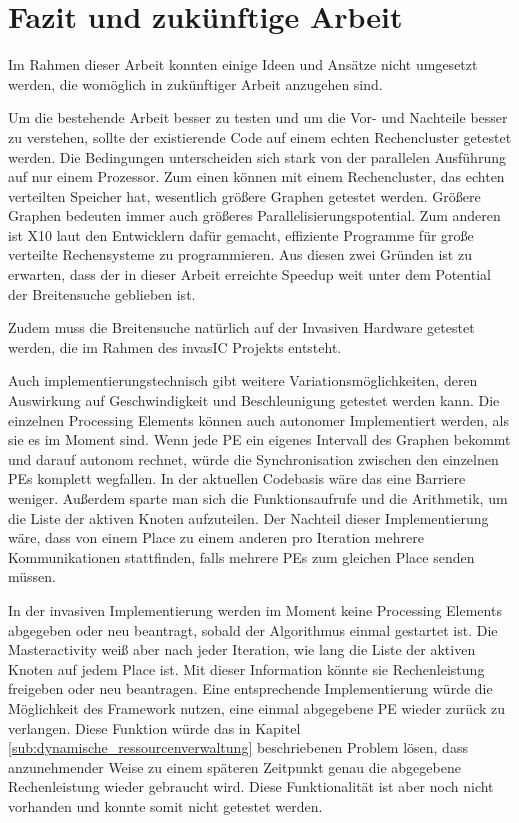 \chapter{Fazit und zukünftige Arbeit} %
\label{cha:fazit_und_zuk_nftige_arbeit}

Im Rahmen dieser Arbeit konnten einige Ideen und Ansätze nicht umgesetzt werden, die womöglich in zukünftiger Arbeit anzugehen sind.

Um die bestehende Arbeit besser zu testen und um die Vor- und Nachteile besser zu verstehen, sollte der existierende Code auf einem echten Rechencluster getestet werden. Die Bedingungen unterscheiden sich stark von der parallelen Ausführung auf nur einem Prozessor. Zum einen können mit einem Rechencluster, das echten verteilten Speicher hat, wesentlich größere Graphen getestet werden. Größere Graphen bedeuten immer auch größeres Parallelisierungspotential. Zum anderen ist X10 laut den Entwicklern dafür gemacht, effiziente Programme für große verteilte Rechensysteme zu programmieren. Aus diesen zwei Gründen ist zu erwarten, dass der in dieser Arbeit erreichte Speedup weit unter dem Potential der Breitensuche geblieben ist. 

Zudem muss die Breitensuche natürlich auf der Invasiven Hardware getestet werden, die im Rahmen des invasIC Projekts entsteht.

Auch implementierungstechnisch gibt weitere Variationsmöglichkeiten, deren Auswirkung auf Geschwindigkeit und Beschleunigung getestet werden kann. Die einzelnen Processing Elements können auch autonomer Implementiert werden, als sie es im Moment sind. Wenn jede PE ein eigenes Intervall des Graphen bekommt und darauf autonom rechnet, würde die Synchronisation zwischen den einzelnen PEs komplett wegfallen. In der aktuellen Codebasis wäre das eine Barriere weniger. Außerdem sparte man sich die Funktionsaufrufe und die Arithmetik, um die Liste der aktiven Knoten aufzuteilen. Der Nachteil dieser Implementierung wäre, dass von einem Place zu einem anderen pro Iteration mehrere Kommunikationen stattfinden, falls mehrere PEs zum gleichen Place senden müssen. 

In der invasiven Implementierung werden im Moment keine Processing Elements abgegeben oder neu beantragt, sobald der Algorithmus einmal gestartet ist. Die Masteractivity weiß aber nach jeder Iteration, wie lang die Liste der aktiven Knoten auf jedem Place ist. Mit dieser Information könnte sie Rechenleistung freigeben oder neu beantragen. Eine entsprechende Implementierung würde die Möglichkeit des Framework nutzen, eine einmal abgegebene PE wieder zurück zu verlangen. Diese Funktion würde das in Kapitel \ref{sub:dynamische_ressourcenverwaltung} beschriebenen Problem lösen, dass anzunehmender Weise zu einem späteren Zeitpunkt genau die abgegebene Rechenleistung wieder gebraucht wird. Diese Funktionalität ist aber noch nicht vorhanden und konnte somit nicht getestet werden. 

